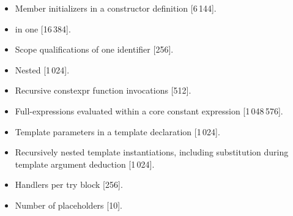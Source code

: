 \begin{itemize}
\item%
Member initializers in a constructor definition [6\,144].
\item%
 in one  [16\,384].
\item%
Scope qualifications of one identifier [256].
\item%
Nested  [1\,024].
\item%
Recursive constexpr function invocations [512].
\item%
Full-expressions evaluated within a core constant expression [1\,048\,576].
\item%
Template parameters in a template declaration [1\,024].
\item%
Recursively nested template instantiations, including substitution
during template argument deduction [1\,024].
\item%
Handlers per try block [256].
\item%
Number of placeholders [10].

\end{itemize}
